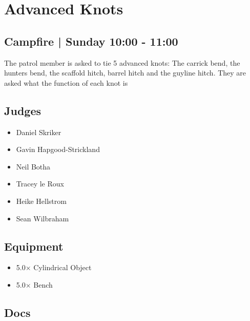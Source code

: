 \documentclass[10pt]{article}
\begin{document}
		\begin{minipage}{\linewidth}
		\setcounter{section}{36}
	\section{Advanced Knots }
	\subsection*{Campfire | Sunday 10:00 - 11:00}

	The patrol member is asked to tie 5 advanced knots: The carrick bend, the hunters bend, the scaffold hitch, barrel hitch and the guyline hitch. They are asked what the function of each knot is

	\begin{multicols}{2}
	\subsection*{\faUsers \: Judges}
	\begin{itemize}
			\item Daniel Skriker
			\item Gavin Hapgood-Strickland
			\item Neil Botha
			\item Tracey le Roux
			\item Heike Hellstrom
			\item Sean Wilbraham
		\end{itemize}
	\columnbreak
	\subsection*{\faWrench \: Equipment}
	
        \begin{itemize}
                    \item 5.0$\times$ \: Cylindrical Object
                    \item 5.0$\times$ \: Bench
                \end{itemize}
                \vfill\null
        \subsection*{\faFile \: Docs}
     	\end{multicols}


	\vspace{1cm}
	\end{minipage}
\end{document}
